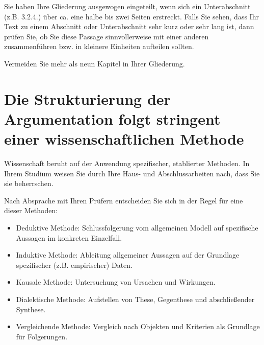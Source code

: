 Sie haben Ihre Gliederung ausgewogen eingeteilt, wenn sich ein Unterabschnitt (z.B. 3.2.4.) über ca. eine halbe bis zwei Seiten erstreckt. Falls Sie sehen, dass Ihr Text zu einem Abschnitt oder Unterabschnitt sehr kurz oder sehr lang ist, dann prüfen Sie, ob Sie diese Passage sinnvollerweise mit einer anderen zusammenführen bzw. in kleinere Einheiten aufteilen sollten.

Vermeiden Sie mehr als neun Kapitel in Ihrer Gliederung.

\section{Die Strukturierung der Argumentation folgt stringent einer wissenschaftlichen Methode}
\label{sec:strukturierung-methode}

Wissenschaft beruht auf der Anwendung spezifischer, etablierter Methoden. In Ihrem Studium weisen Sie durch Ihre Haus- und Abschlussarbeiten nach, dass Sie sie beherrschen.

Nach Absprache mit Ihren Prüfern entscheiden Sie sich in der Regel für eine dieser Methoden:
\begin{itemize}[label={--}]
\item Deduktive Methode: Schlussfolgerung vom allgemeinen Modell auf spezifische Aussagen im konkreten Einzelfall.
\item Induktive Methode: Ableitung allgemeiner Aussagen auf der Grundlage spezifischer (z.B. empirischer) Daten.
\item Kausale Methode: Untersuchung von Ursachen und Wirkungen.
\item Dialektische Methode: Aufstellen von These, Gegenthese und abschließender Synthese.
\item Vergleichende Methode: Vergleich nach Objekten und Kriterien als Grundlage für Folgerungen.
\end{itemize}